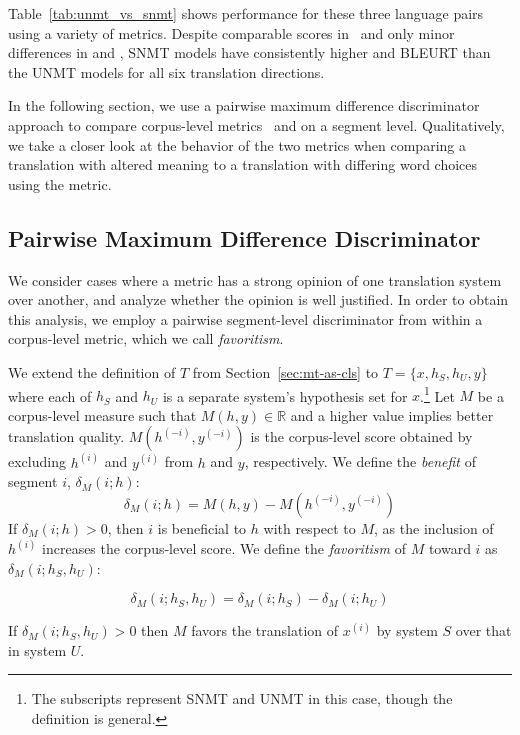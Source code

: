  Table~\ref{tab:unmt_vs_snmt} shows performance for these three language pairs using a variety of metrics. Despite comparable scores in \bleu\ and only minor differences in  and , SNMT models have consistently higher  and BLEURT than the UNMT models for all six translation directions. 
 
 In the following section, we use a pairwise maximum difference discriminator approach to compare corpus-level metrics \bleu\ and  on a segment level. Qualitatively, we take a closer look at the behavior of the two metrics when comparing a translation with altered meaning to a translation with differing word choices using the metric.


\subsection{Pairwise Maximum Difference Discriminator}

We consider cases where a metric has a strong opinion of one translation system over another, and analyze whether the opinion is well justified. In order to obtain this analysis, we employ a pairwise segment-level discriminator from within a corpus-level metric, which we call \textit{favoritism}.

We extend the definition of $T$ from Section~\ref{sec:mt-as-cls} to $T = \{ x, h_S, h_U, y\}$ where each of $h_S$ and $h_U$ is a separate system's hypothesis set for $x$.\footnote{The subscripts represent SNMT and UNMT in this case, though the definition is general.}
Let $M$ be a corpus-level measure such that $M(h, y) \in \mathbb{R}$ and a higher value implies better translation quality. $M(h^{(-i)}, y^{(-i)})$ is the corpus-level score obtained by excluding $h^{(i)}$ and $y^{(i)}$ from $h$ and $y$, respectively. We define the \textit{benefit} of segment $i$, $\delta_{M} (i; h)$:
$$\delta_{M} (i; h) = M(h, y) - M(h^{(-i)}, y^{(-i)})$$
If $\delta_{M} (i; h) > 0$, then $i$ is beneficial to $h$ with respect to $M$, as the inclusion of $h^{(i)}$ increases the corpus-level score. 
We define the \textit{favoritism} of $M$ toward $i$ as $\delta_{M} (i; h_S, h_U)$:

\begin{equation}
\delta_{M} (i; h_S, h_U) =\delta_{M} (i; h_S) - \delta_{M} (i; h_U)
\label{eq:deleterious}
\end{equation}

If $\delta_{M} (i; h_S, h_U) > 0$ then $M$ favors the translation of $x^{(i)}$ by system $S$ over that in system $U$. 

